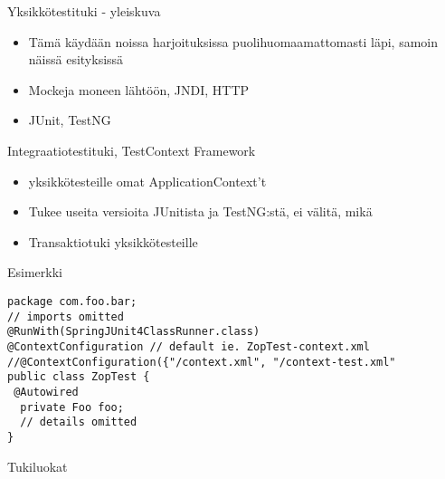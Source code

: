 \documentclass[hyperref={pdfauthor=\AUTHOR},14pt]{beamer}
\author{\AUTHOR}
\title[\TITLE]{\TITLE}
\date{\DATE}
\begin{document}
\begin{frame}[plain]
\titlepage
\end{frame}

\begin{frame}{Yksikkötestituki - yleiskuva}

\begin{itemize}
\item Tämä käydään noissa harjoituksissa puolihuomaamattomasti läpi, samoin näissä esityksissä
\item Mockeja moneen lähtöön, JNDI, HTTP
\item JUnit, TestNG
\end{itemize}
\end{frame}

\begin{frame}{Integraatiotestituki, TestContext Framework}
\begin{itemize}
\item yksikkötesteille omat ApplicationContext't
\item Tukee useita versioita JUnitista ja TestNG:stä, ei välitä, mikä 
\item Transaktiotuki yksikkötesteille
\end{itemize}
\end{frame}

\begin{frame}[t, fragile]{Esimerkki}
\begin{lstlisting}[style=Java]
package com.foo.bar;
// imports omitted
@RunWith(SpringJUnit4ClassRunner.class)
@ContextConfiguration // default ie. ZopTest-context.xml
//@ContextConfiguration({"/context.xml", "/context-test.xml"
public class ZopTest {
 @Autowired
  private Foo foo;
  // details omitted
}
\end{lstlisting}
\end{frame}

\begin{frame}[t, fragile]{Tukiluokat}
\end{frame}
\end{document}
